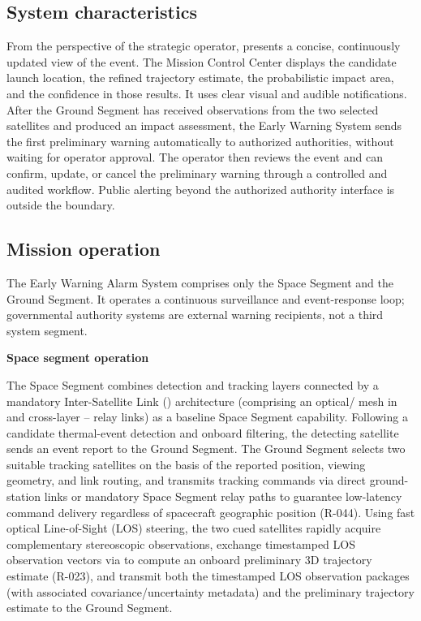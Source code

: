 \subsection{System characteristics}

From the perspective of the strategic operator,  presents a concise, continuously updated view of the event. The Mission Control Center displays the candidate launch location, the refined trajectory estimate, the probabilistic impact area, and the confidence in those results. It uses clear visual and audible notifications. After the Ground Segment has received observations from the two selected  satellites and produced an impact assessment, the Early Warning System sends the first preliminary warning automatically to authorized authorities, without waiting for operator approval. The operator then reviews the event and can confirm, update, or cancel the preliminary warning through a controlled and audited workflow. Public alerting beyond the authorized authority interface is outside the  boundary. 

\subsection{Mission operation}

The Early Warning Alarm System comprises only the Space Segment and the Ground Segment. It operates a continuous surveillance and event-response loop; governmental authority systems are external warning recipients, not a third system segment. 

\textbf{Space segment operation}

The Space Segment combines  detection and  tracking layers connected by a mandatory Inter-Satellite Link () architecture (comprising an optical/  mesh in  and cross-layer -- relay links) as a baseline Space Segment capability. Following a candidate thermal-event detection and onboard filtering, the detecting  satellite sends an event report to the Ground Segment. The Ground Segment selects two suitable  tracking satellites on the basis of the reported position, viewing geometry, and link routing, and transmits tracking commands via direct ground-station links or mandatory Space Segment  relay paths to guarantee low-latency command delivery regardless of spacecraft geographic position (R-044). Using fast optical Line-of-Sight (LOS) steering, the two cued  satellites rapidly acquire complementary stereoscopic observations, exchange timestamped LOS observation vectors via  to compute an onboard preliminary 3D trajectory estimate (R-023), and transmit both the timestamped LOS observation packages (with associated covariance/uncertainty metadata) and the preliminary trajectory estimate to the Ground Segment.

